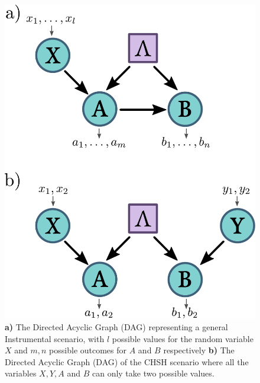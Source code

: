 \documentclass[letterpaper]{article}
\begin{document}


\begin{figure}[h]
    \centering
    \includegraphics[width=.8\columnwidth]{images/chsh_inst_dag.pdf}
        \caption{
    \textbf{a)} The Directed Acyclic Graph (DAG) representing a general
    Instrumental scenario, with $l$ possible values for the random variable $X$
    and $m,n$ possible outcomes for $A$ and $B$ respectively
    \textbf{b)} The Directed Acyclic Graph (DAG) of the CHSH scenario where all the
    variables $X,Y,A$ and $B$ can only take two possible values.
}
    \label{fig:chshinstdag}

\end{figure} 
\end{document}
